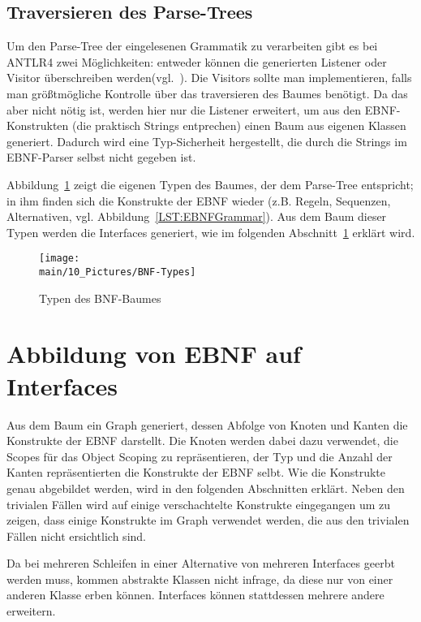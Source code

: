 \documentclass[../InterneDSLs.tex]{subfiles}
\begin{document}
\subsection{Traversieren des Parse-Trees}
Um den Parse-Tree der eingelesenen Grammatik zu verarbeiten gibt es bei ANTLR4 zwei Möglichkeiten: entweder können die generierten Listener oder Visitor überschreiben werden(vgl.~\cite[S. 112 ff]{Parr.2012}). Die Visitors sollte man implementieren, falls man größtmögliche Kontrolle über das traversieren des Baumes benötigt. Da das aber nicht nötig ist, werden hier nur die Listener erweitert, um aus den EBNF-Konstrukten (die praktisch Strings entprechen) einen Baum aus eigenen Klassen generiert. Dadurch wird eine Typ-Sicherheit hergestellt, die durch die Strings im EBNF-Parser selbst nicht gegeben ist.

Abbildung~\ref{FIG:TypesBNF} zeigt die eigenen Typen des Baumes, der dem Parse-Tree entspricht; in ihm finden sich die Konstrukte der EBNF wieder (z.B. Regeln, Sequenzen, Alternativen, vgl. Abbildung~\ref{LST:EBNFGrammar}). Aus dem Baum dieser Typen werden die Interfaces generiert, wie im folgenden Abschnitt~\ref{SEC:EBNFtoInterface} erklärt wird.

\begin{figure}[ht]
\centering
\texttt{[image: \\main/10\_Pictures/BNF-Types]}
\caption{Typen des BNF-Baumes}
\label{FIG:TypesBNF}
\end{figure}

\section{Abbildung von EBNF auf Interfaces}\label{SEC:EBNFtoInterface}
Aus dem Baum ein Graph generiert, dessen Abfolge von Knoten und Kanten die Konstrukte der EBNF darstellt. Die Knoten werden dabei dazu verwendet, die Scopes für das Object Scoping zu repräsentieren, der Typ und die Anzahl der Kanten repräsentierten die Konstrukte der EBNF selbt. Wie die Konstrukte genau abgebildet werden, wird in den folgenden Abschnitten erklärt. Neben den trivialen Fällen wird auf einige verschachtelte Konstrukte eingegangen um zu zeigen, dass einige Konstrukte im Graph verwendet werden, die aus den trivialen Fällen nicht ersichtlich sind.

Da bei mehreren Schleifen in einer Alternative von mehreren Interfaces geerbt werden muss, kommen abstrakte Klassen nicht infrage, da diese nur von einer anderen Klasse erben können. Interfaces können stattdessen mehrere andere erweitern.
\end{document}
